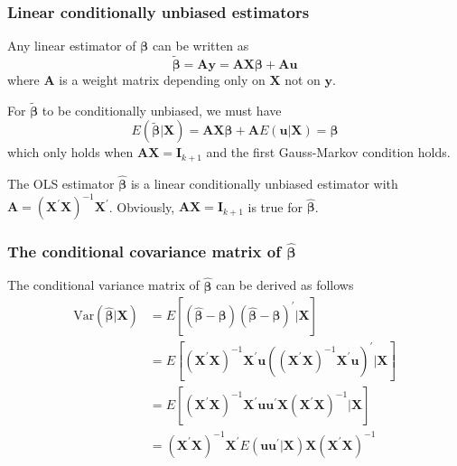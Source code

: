 \documentclass[a4paper,11pt]{article}
\newcommand{\var}{\mathrm{Var}}
\begin{document}
\subsubsection*{Linear conditionally unbiased estimators}
\label{sec:org0bf96f8}

Any linear estimator of \(\boldsymbol{\beta}\) can be written as
\[ \tilde{\boldsymbol{\beta}} = \mathbf{Ay} = \mathbf{AX}\boldsymbol{\beta} + \mathbf{Au} \]
where \(\mathbf{A}\) is a weight matrix depending only on \(\mathbf{X}\)
not on \(\mathbf{y}\).

For \(\tilde{\boldsymbol{\beta}}\) to be conditionally unbiased, we must
have
\begin{equation*}
E(\tilde{\boldsymbol{\beta}} | \mathbf{X}) = \mathbf{AX} \boldsymbol{\beta} + \mathbf{A} E(\mathbf{u} | \mathbf{X}) = \boldsymbol{\beta}
\end{equation*}
which only holds when \(\mathbf{AX} = \mathbf{I}_{k+1}\) and the first
Gauss-Markov condition holds.

The OLS estimator \(\hat{\boldsymbol{\beta}}\) is a linear conditionally
unbiased estimator with \(\mathbf{A} = \left(\mathbf{X}^{\prime}
\mathbf{X}\right)^{-1} \mathbf{X}^{\prime}\). Obviously, \(\mathbf{AX} =
\mathbf{I}_{k+1}\) is true for \(\hat{\boldsymbol{\beta}}\).

\subsubsection*{The conditional covariance matrix of \(\hat{\boldsymbol{\beta}}\)}
\label{sec:org253d165}

The conditional variance matrix of \(\hat{\boldsymbol{\beta}}\) can be
derived as follows
\begin{equation*}
\begin{split}
\var(\hat{\boldsymbol{\beta}} | \mathbf{X}) &= E\left[ (\hat{\boldsymbol{\beta}} - \boldsymbol{\beta})(\hat{\boldsymbol{\beta}} - \boldsymbol{\beta})^{\prime} | \mathbf{X}\right] \\
&= E\left[ \left(\mathbf{X}^{\prime} \mathbf{X}\right)^{-1} \mathbf{X}^{\prime} \mathbf{u} \left(\left(\mathbf{X}^{\prime} \mathbf{X}\right)^{-1} \mathbf{X}^{\prime} \mathbf{u} \right)^{\prime} | \mathbf{X} \right] \\
&= E\left[ \left(\mathbf{X}^{\prime} \mathbf{X}\right)^{-1} \mathbf{X}^{\prime} \mathbf{u} \mathbf{u}^{\prime} \mathbf{X} (\mathbf{X}^{\prime} \mathbf{X})^{-1} | \mathbf{X} \right] \\
&= \left(\mathbf{X}^{\prime} \mathbf{X}\right)^{-1} \mathbf{X}^{\prime} E(\mathbf{uu}^{\prime} | \mathbf{X}) \mathbf{X} (\mathbf{X}^{\prime} \mathbf{X})^{-1}
\end{split}
\end{equation*}
\end{document}

